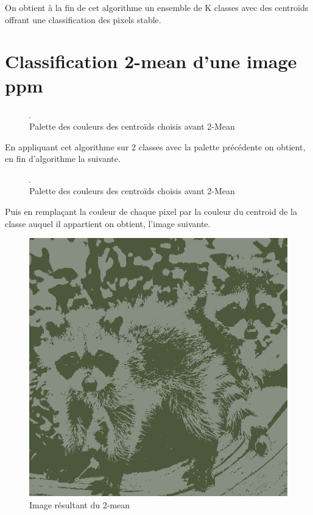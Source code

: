 \documentclass{article}
\begin{document}
On obtient à la fin de cet algorithme un ensemble de K classes avec des centroïds offrant une classification des pixels stable.
\newpage
\section{Classification 2-mean d'une image ppm}

\begin{figure}[h]
\centerline{\includegraphics[scale=50]{./rendus/Palette2Before.png}}
\caption{Palette des couleurs des centroïds choisis avant 2-Mean}
\end{figure}

En appliquant cet algorithme sur 2 classes avec la palette précédente on obtient, en fin d'algorithme la suivante.


\begin{figure}[h]
\centerline{\includegraphics[scale=50]{./rendus/Palette2.png}}
\caption{Palette des couleurs des centroïds choisis avant 2-Mean}
\end{figure}


Puis en remplaçant la couleur de chaque pixel par la couleur du centroid de la classe auquel il appartient on obtient, l'image suivante.

\begin{figure}[h]
\centerline{\includegraphics[scale=0.5]{./rendus/Nicoon2Color.png}}
\caption{Image résultant du 2-mean}
\end{figure}
\end{document}
